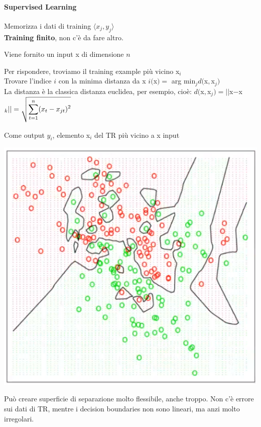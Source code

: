 \documentclass[10pt]{book}
\begin{document}
\paragraph{Supervised Learning} 
\begin{list}{}{Alcune definizioni}
	\item Memorizza i dati di training $\langle x_j, y_j\rangle$\\
	\textbf{Training finito}, non c'è da fare altro.
	\item Viene fornito un input x di dimensione $n$
	\item Per rispondere, troviamo il training example più vicino x$_i$\\
	Trovare l'indice $i$ con la minima distanza da x $i($x$) =$ arg min$_j d($x$, $x$_j)$\\
	La distanza è la classica distanza euclidea, per esempio, cioè: $d($x$, $x$_j) = ||$x$ - $x$_k|| = \sqrt{\mathlarger{\sum_{t=1}^n (x_t - x_{jt})^2}}$
	\item Come output $y_i$, elemento x$_i$ del TR più vicino a x input
\end{list}
\begin{center}
	\includegraphics[scale=0.75]{ml1nn.png}
\end{center}
Può creare superficie di separazione molto flessibile, anche troppo. Non c'è errore sui dati di TR, mentre i decision boundaries non sono lineari, ma anzi molto irregolari.
\end{document}
